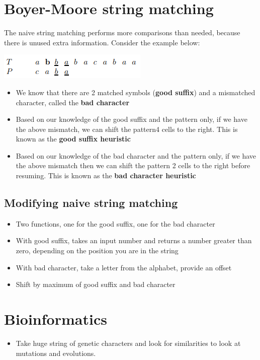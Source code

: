 \documentclass{article}[18pt]
\begin{document}
\section{Boyer-Moore string matching}
The naive string matching performs more comparisons than needed, because there is unused extra information. Consider the example below:
\begin{center}
	\includegraphics[scale=0.7]{Boyer-Moore}
\end{center}
\begin{itemize}
	\item We know that there are 2 matched symbols (\textbf{good suffix}) and a mismatched character, called the \textbf{bad character}
	\item Based on our knowledge of the good suffix and the pattern only, if we have the above mismatch, we can shift the pattern4 cells to the right. This is known as the \textbf{good suffix heuristic}
	\item Based on our knowledge of the bad character and the pattern only, if we have the above mismatch then we can shift the pattern 2 cells to the right before resuming. This is known as the \textbf{bad character heuristic}
\end{itemize}
\subsection{Modifying naive string matching}
\begin{itemize}
	\item Two functions, one for the good suffix, one for the bad character
	\item With good suffix, takes an input number and returns a number greater than zero, depending on the position you are in the string
	\item With bad character, take a letter from the alphabet, provide an offset
	\item Shift by maximum of good suffix and bad character
\end{itemize}
\section{Bioinformatics}
\begin{itemize}
	\item Take huge string of genetic characters and look for similarities to look at mutations and evolutions.
\end{itemize}
\end{document}
